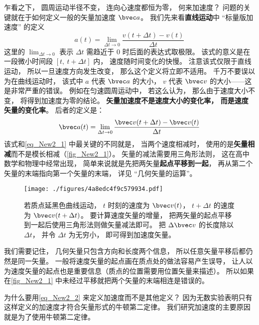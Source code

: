 乍看之下， 圆周运动半径不变， 连向心速度都恒为零， 何来加速度？ 问题的关键就在于如何定义一般的矢量加速度 $\bvec a$。 我们先来看\textbf{直线运动}中 “标量版加速度” 的定义
\begin{equation}\label{eq_New2_1}
a(t) = \lim_{\Delta t\to 0}\frac{v(t+\Delta t) - v(t)}{\Delta t}
\end{equation}
这里的 $\lim_{\Delta t\to 0}$ 表示 $\Delta t$ 需趋近于 0 时后面的表达式取极限。 该式的意义是在一段微小时间段 $[t,\ t+\Delta t]$ 内， 速度随时间变化的快慢。 注意该式仅限于直线运动， 所以一旦速度方向发生改变， 那么这个定义将立即不适用。 千万不要误以为在曲线运动时， 该式中 $a$ 代表 $\bvec a$ 的大小， $v$ 代表 $\bvec v$ 的大小——这是非常严重的错误。 例如在匀速圆周运动中， 若这么认为， 那么由于速度大小不变， 将得到加速度为零的结论。 \textbf{矢量加速度不是速度大小的变化率， 而是速度矢量的变化率}。 后者的定义是：
\begin{equation}\label{eq_New2_2}
\bvec a(t) = \lim_{\Delta t\to 0}\frac{\bvec v(t+\Delta t) - \bvec v(t)}{\Delta t}
\end{equation}
该式和\autoref{eq_New2_1} 中最关键的不同就是， 当两个速度相减时， 使用的是\textbf{矢量相减}而不是模长相减（\autoref{fig_New2_1}）。 矢量的减法需要用三角形法则， 这在高中数学和物理中经常出现， 简单来说就是先把两矢量\textbf{起点平移到一起}， 再从第二个矢量的末端指向第一个矢量的末端， 详见 “几何矢量的运算”。

\begin{figure}[ht]
\centering
\texttt{[image: ./figures/4a8edc4f9c579934.pdf]}
\caption{若质点延黑色曲线运动， $t$ 时刻的速度为 $\bvec v(t)$， $t+\Delta t$ 的速度为 $\bvec v(t+\Delta t)$。 要计算速度矢量的增量， 把两矢量的起点平移到一起后使用三角形法则做矢量减法即可。 把 $\Delta \bvec v$ 的长度除以 $\Delta t$， 并令 $\Delta t$ 为无穷小， 即可得到加速度矢量。} \label{fig_New2_1}
\end{figure}

我们需要记住， 几何矢量只包含方向和长度两个信息， 所以任意矢量平移后都仍然是同一矢量。 一般将速度矢量的起点画在质点处的做法容易产生误导， 让人以为速度矢量的起点也是重要信息（质点的位置需要用位置矢量来描述）。 所以如果在\autoref{fig_New2_1} 中未经过平移就把两个矢量的末端相连是错误的。

为什么要用\autoref{eq_New2_2} 来定义加速度而不是其他定义？ 因为无数实验表明只有这样定义的加速度才符合矢量形式的牛顿第二定律。 我们研究加速度的主要原因就是为了使用牛顿第二定律。


